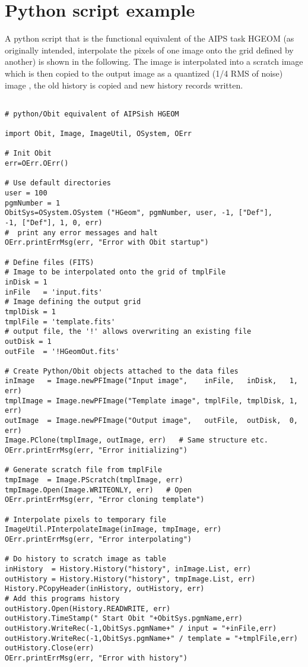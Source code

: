 \documentclass[11pt]{article}
\begin{document}
\section{Python script example}
A python script that is the functional equivalent of the AIPS task
HGEOM (as originally intended, interpolate the pixels of one image
onto the grid defined by another) is shown in the following.
The image is interpolated into a scratch image which is then copied to
the output image as a quantized (1/4 RMS of noise) image , the old
history is copied and new history records written.
\begin{verbatim}

# python/Obit equivalent of AIPSish HGEOM

import Obit, Image, ImageUtil, OSystem, OErr

# Init Obit
err=OErr.OErr()

# Use default directories
user = 100
pgmNumber = 1
ObitSys=OSystem.OSystem ("HGeom", pgmNumber, user, -1, ["Def"], 
-1, ["Def"], 1, 0, err)
#  print any error messages and halt
OErr.printErrMsg(err, "Error with Obit startup")

# Define files (FITS)
# Image to be interpolated onto the grid of tmplFile
inDisk = 1
inFile   = 'input.fits'     
# Image defining the output grid
tmplDisk = 1
tmplFile = 'template.fits'
# output file, the '!' allows overwriting an existing file
outDisk = 1
outFile  = '!HGeomOut.fits'

# Create Python/Obit objects attached to the data files
inImage   = Image.newPFImage("Input image",    inFile,   inDisk,   1, err)
tmplImage = Image.newPFImage("Template image", tmplFile, tmplDisk, 1, err)
outImage  = Image.newPFImage("Output image",   outFile,  outDisk,  0, err)
Image.PClone(tmplImage, outImage, err)   # Same structure etc.
OErr.printErrMsg(err, "Error initializing")

# Generate scratch file from tmplFile
tmpImage  = Image.PScratch(tmplImage, err)
tmpImage.Open(Image.WRITEONLY, err)   # Open
OErr.printErrMsg(err, "Error cloning template")

# Interpolate pixels to temporary file
ImageUtil.PInterpolateImage(inImage, tmpImage, err)
OErr.printErrMsg(err, "Error interpolating")

# Do history to scratch image as table
inHistory  = History.History("history", inImage.List, err)
outHistory = History.History("history", tmpImage.List, err)
History.PCopyHeader(inHistory, outHistory, err)
# Add this programs history
outHistory.Open(History.READWRITE, err)
outHistory.TimeStamp(" Start Obit "+ObitSys.pgmName,err)
outHistory.WriteRec(-1,ObitSys.pgmName+" / input = "+inFile,err)
outHistory.WriteRec(-1,ObitSys.pgmName+" / template = "+tmplFile,err)
outHistory.Close(err)
OErr.printErrMsg(err, "Error with history")


\end{verbatim}
\end{document}
